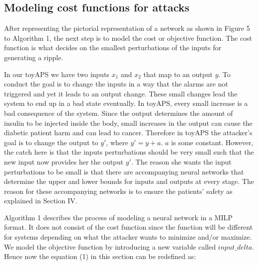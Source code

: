 \subsection{Modeling cost functions for attacks}
\label{section:costfunction}
After representing the pictorial representation of a network as shown in Figure 5 to Algorithm 1, the next step is to model the cost or objective function. The cost function is what decides on the smallest perturbations of the inputs for generating a ripple. 

In our toyAPS we have two inputs $x_1$ and $x_2$ that map to an output $y$. To conduct \attack the goal is to change the inputs in a way that the alarms are not triggered and yet it leads to an output change. These small changes lead the system to end up in a bad state eventually. In toyAPS, every small increase is a bad consequence of the system. Since the output determines the amount of insulin to be injected inside the body, small increases in the output can cause the diabetic patient harm \cite{ZHANG2019403} and can lead to cancer. 
Therefore in toyAPS the attacker's goal is to change the output to $y'$, where $y' = y + a$. $a$ is some constant. %
However, the catch here is that the inputs perturbations should be very small such that the new input now provides her the output $y'$.  The reason she wants the input perturbations to be small is that there are accompanying neural networks that determine the upper and lower bounds for inputs and outputs at every stage. The reason for these accompanying networks is to ensure the patients' safety as explained in Section IV.%

Algorithm 1 describes the process of modeling a neural network in a MILP format. It does not consist of the cost function since the function will be different for systems depending on what the attacker wants to minimize and/or maximize. We model the objective function by introducing a new variable called $input\_delta$. Hence now the equation (1) in this section can be redefined as:

